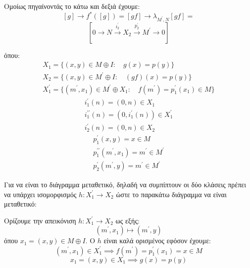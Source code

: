 \documentclass{article}
\begin{document}
\begin{enumerate}
Ομοίως πηγαίνοντάς το κάτω και δεξιά έχουμε:
$$[g] \rightarrow f^* ([g]) = [gf] \rightarrow \lambda_{M^{\prime} , N}[gf] = $$
$$[0 \rightarrow N \xrightarrow{ i^{\prime}_2} X_2 \xrightarrow{p^{\prime}_2 } M^{\prime} \rightarrow 0 ]$$

όπου:
\begin{gather*}
	X_1 = \{ (x,y) \in M \oplus I : \quad g(x) = p(y) \} \\
	X_2 = \{ (x,y) \in M^{\prime} \oplus I : \quad (gf)(x) = p(y) \} \\
	X^{\prime}_1 = \{ (m^{\prime}, x_1) \in M^{\prime} \oplus X_1: \quad f(m^{\prime}) = p^{\prime}_1 (x_1) \in M \}
\end{gather*}
\begin{gather*}
	i^{\prime}_1 (n) = (0,n) \in X_1 \\
	i^{ \prime \prime}_1 (n) = (0 , i^{\prime}_1 (n)) \in X^{\prime}_1 \\
	i^{\prime}_2 (n) = (0,n) \in X_2
\end{gather*}
\begin{gather*}
	p^{\prime}_1( x,y) = x \in M \\
	p^{\prime \prime}_1 (m^{\prime} , x_1) = m^{\prime} \in M^{\prime} \\
	p^{\prime}_2 (m^{\prime} , y ) = m^{\prime} \in M^{\prime}
\end{gather*}
	
Για να είναι το διάγραμμα μεταθετικό, δηλαδή να συμπίπτουν οι δύο κλάσεις πρέπει να υπάρχει ισομορφισμός $h: X^{\prime}_1 \rightarrow X_2$ ώστε το παρακάτω διάγραμμα να είναι μεταθετικό:

\begin{center}
\end{center}

Ορίζουμε την απεικόνιση $h : X^{\prime}_1 \rightarrow X_2$ ως εξής:
$$(m^{\prime},x_1) \longmapsto (m^{\prime}, y)$$
όπου $x_1 = (x,y) \in M \oplus I$. Ο $h$ είναι καλά ορισμένος εφόσον έχουμε:
$$(m^{\prime}, x_1) \in X^{\prime}_1 \implies f(m^{\prime}) = p^{\prime}_1 (x_1) = x \in M$$
$$x_1 = (x,y) \in X_1 \implies g(x) = p(y)$$


\end{enumerate}
\end{document}
